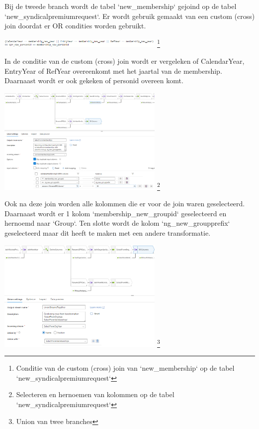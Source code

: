 Bij de tweede branch wordt de tabel `new\_membership` gejoind op de tabel `new\_syndicalpremiumrequest`. Er wordt gebruik gemaakt van een custom (cross) join doordat er OR condities worden gebruikt. 

\begin{center}
    \includegraphics[width=0.6\textwidth]{./graphics/adf/bepalen_groep_7.png}
    \footnote{Conditie van de custom (cross) join van `new\_membership` op de tabel `new\_syndicalpremiumrequest`}
\end{center}

In de conditie van de custom (cross) join wordt er vergeleken of CalendarYear, EntryYear of RefYear overeenkomt met het jaartal van de membership. Daarnaast wordt er ook gekeken of personid overeen komt.

\begin{center}
    \includegraphics[width=0.6\textwidth]{./graphics/adf/bepalen_groep_8.png}
    \footnote{Selecteren en hernoemen van kolommen op de tabel `new\_syndicalpremiumrequest`}
\end{center}

Ook na deze join worden alle kolommen die er voor de join waren geselecteerd. Daarnaast wordt er 1 kolom `membership\_new\_groupid` geselecteerd en hernoemd naar `Group`. Ten slotte wordt de kolom `ng\_new\_groupprefix` geselecteerd maar dit heeft te maken met een andere transformatie.

\begin{center}
    \includegraphics[width=0.6\textwidth]{./graphics/adf/bepalen_groep_9.png}
    \footnote{Union van twee branches}
\end{center}

